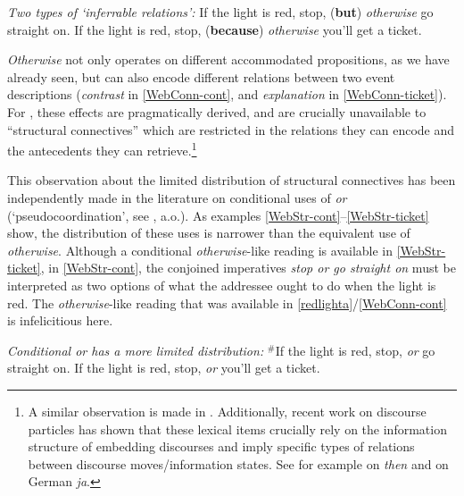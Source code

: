 \pex \label{WebConn} \textit{Two types of `inferrable relations':}
\a \label{WebConn-cont} If the light is red, stop, (\textbf{but}) \textit{otherwise} go straight on.
\a \label{WebConn-ticket} If the light is red, stop, (\textbf{because}) \textit{otherwise} you'll get a ticket.\xe


\textit{Otherwise} not only operates on different accommodated propositions, as we have already seen, but can also encode different relations between two event descriptions (\textit{contrast} in \ref{WebConn-cont}, and \textit{explanation} in \ref{WebConn-ticket}). For \citet[17]{Webber2001}, these effects are pragmatically derived, and are crucially unavailable to ``structural connectives'' which are restricted in the relations they can encode and the antecedents they can retrieve.\footnote{A similar observation is made in  \citet{Corblin1994,Corblin2002}. Additionally, recent work on discourse particles has shown that these lexical items crucially rely on the information structure of embedding discourses and imply specific types of relations between discourse moves/information states. See for example \citealp{Biezma2014} on \textit{then} and \citealp{Viesel2015} on German \textit{ja}.\label{fn:discourse-particles}}

This observation about the limited distribution of structural connectives has been independently made in the literature on  conditional uses of \textit{or} (`pseudocoordination', see \citealp{Culicover1997, Klinedinst2012, Biezma2016}, a.o.). As examples \ref{WebStr-cont}--\ref{WebStr-ticket} show, the distribution of these uses is narrower than the equivalent use of \textit{otherwise}. Although a conditional \textit{otherwise}-like reading is available in \ref{WebStr-ticket}, in \ref{WebStr-cont}, the conjoined imperatives \textit{stop or go straight on} must be interpreted as two options of what the addressee ought to do when the light is red. The \textit{otherwise}-like reading that was available in \ref{redlighta}/\ref{WebConn-cont} is infelicitious here.%

\pex \label{WebStr} \textit{Conditional \emph{or} has a more limited distribution:}
\a \label{WebStr-cont}$ ^{\#} $If the light is red, stop, \textit{or}  go straight on.
\a \label{WebStr-ticket} If the light is red, stop, \textit{or} you'll get a ticket.\xe


